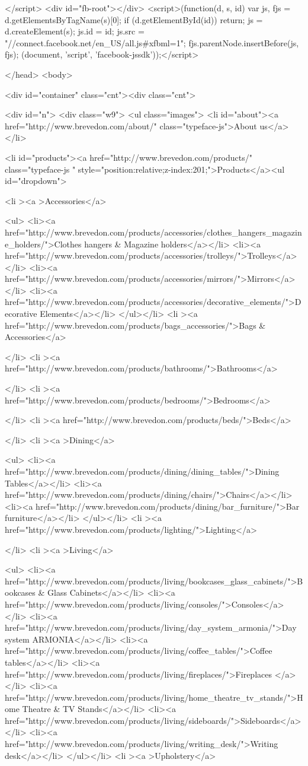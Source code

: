 </script>
<div id="fb-root"></div>
<script>(function(d, s, id) {
  var js, fjs = d.getElementsByTagName(s)[0];
  if (d.getElementById(id)) {return;}
  js = d.createElement(s); js.id = id;
  js.src = "//connect.facebook.net/en_US/all.js#xfbml=1";
  fjs.parentNode.insertBefore(js, fjs);
}(document, 'script', 'facebook-jssdk'));</script>

</head>
<body>

<div id="container" class="cnt"><div class="cnt"> 


<div id="n"> 	
		<div class="w9">
			<ul class="images">
				<li id="about"><a href="http://www.brevedon.com/about/" class="typeface-js">About us</a></li>
				
<li id="products"><a href="http://www.brevedon.com/products/" class="typeface-js " style="position:relative;z-index:201;">Products</a><ul id="dropdown">


	<li ><a >Accessories</a>
	
	<ul>	<li><a  href="http://www.brevedon.com/products/accessories/clothes_hangers_magazine_holders/">Clothes hangers & Magazine holders</a></li>
		<li><a  href="http://www.brevedon.com/products/accessories/trolleys/">Trolleys</a></li>
		<li><a  href="http://www.brevedon.com/products/accessories/mirrors/">Mirrors</a></li>
		<li><a  href="http://www.brevedon.com/products/accessories/decorative_elements/">Decorative Elements</a></li>
	</ul></li>
	<li ><a href="http://www.brevedon.com/products/bags_accessories/">Bags & Accessories</a>
	
	</li>
	<li ><a href="http://www.brevedon.com/products/bathrooms/">Bathrooms</a>
	
	</li>
	<li ><a href="http://www.brevedon.com/products/bedrooms/">Bedrooms</a>
	
	</li>
	<li ><a href="http://www.brevedon.com/products/beds/">Beds</a>
	
	</li>
	<li ><a >Dining</a>
	
	<ul>	<li><a  href="http://www.brevedon.com/products/dining/dining_tables/">Dining Tables</a></li>
		<li><a  href="http://www.brevedon.com/products/dining/chairs/">Chairs</a></li>
		<li><a  href="http://www.brevedon.com/products/dining/bar_furniture/">Bar furniture</a></li>
	</ul></li>
	<li ><a href="http://www.brevedon.com/products/lighting/">Lighting</a>
	
	</li>
	<li ><a >Living</a>
	
	<ul>	<li><a  href="http://www.brevedon.com/products/living/bookcases_glass_cabinets/">Bookcases & Glass Cabinets</a></li>
		<li><a  href="http://www.brevedon.com/products/living/consoles/">Consoles</a></li>
		<li><a  href="http://www.brevedon.com/products/living/day_system_armonia/">Day system ARMONIA</a></li>
		<li><a  href="http://www.brevedon.com/products/living/coffee_tables/">Coffee tables</a></li>
		<li><a  href="http://www.brevedon.com/products/living/fireplaces/">Fireplaces </a></li>
		<li><a  href="http://www.brevedon.com/products/living/home_theatre_tv_stands/">Home Theatre & TV Stands</a></li>
		<li><a  href="http://www.brevedon.com/products/living/sideboards/">Sideboards</a></li>
		<li><a  href="http://www.brevedon.com/products/living/writing_desk/">Writing desk</a></li>
	</ul></li>
	<li ><a >Upholstery</a>
	
